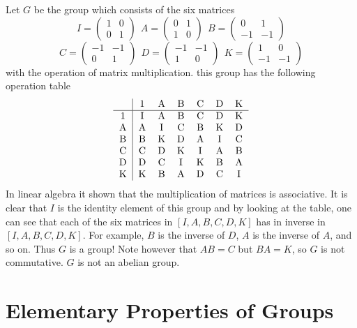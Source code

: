 \documentclass[12pt]{article}
\begin{document}
 \begin{example} Let $G$ be the group which consists of the six matrices 
 $$ I = \begin{pmatrix} 1 & 0 \\ 0 & 1 \end{pmatrix} ~~ A = \begin{pmatrix} 0 & 1 \\ 1 & 0 \end{pmatrix} ~~ B = \begin{pmatrix} 0 & 1 \\ -1 & -1 \end{pmatrix} $$
 $$C = \begin{pmatrix} -1 & -1 \\ 0 & 1 \end{pmatrix} ~~ D = \begin{pmatrix} -1 & -1 \\ 1 & 0 \end{pmatrix} ~~ K = \begin{pmatrix} 1 & 0 \\ -1 & -1 \end{pmatrix} $$ with the operation of matrix multiplication. this group has the following operation table 
 $$\begin{tabular}{c|cccccc} & 1 & A & B & C & D & K \\ \hline 
 1 & I & A & B & C & D & K \\
 A & A & I & C & B & K & D \\
 B & B & K & D & A & I & C \\ 
 C & C & D & K & I & A & B \\ 
 D & D & C & I & K & B & A \\ 
 K & K & B & A & D & C & I \end{tabular} $$ 
 In linear algebra it shown that the multiplication of matrices is associative. It is clear that $I$ is the identity element of this group and by looking at the table, one can see that each of the six matrices in $[I, A, B, C, D, K]$ has in inverse in $[I, A, B, C, D, K]$. For example, $B$ is the inverse of $D$, $A$ is the inverse of $A$, and so on. Thus $G$ is a group! Note however that $AB = C$ but $BA = K$, so $G$ is not commutative. $G$ is not an abelian group. \end{example}

\section{Elementary Properties of Groups}
\end{document}
